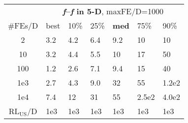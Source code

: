 \begin{tabular}{c|llllll}
 & \multicolumn{6}{|c}{\textbf{\textit{f}\raisebox{-0.35ex}{1}--\textit{f}\raisebox{-0.35ex}{24} in 5-D}, maxFE/D=1000}\\
\#FEs/D & best & 10\% & 25\% & \textbf{med} & 75\% & 90\%\\
2 & \hspace*{1ex}3.2 & \hspace*{1ex}4.2 & \hspace*{1ex}6.4 & \hspace*{1ex}9.2 & 10 & 10\\
10 & \hspace*{1ex}3.2 & \hspace*{1ex}4.4 & \hspace*{1ex}5.5 & 10 & 17 & 50\\
100 & \hspace*{1ex}1.2 & \hspace*{1ex}2.6 & \hspace*{1ex}7.1 & \hspace*{1ex}9.4 & 15 & 40\\
1e3 & \hspace*{1ex}2.7 & \hspace*{1ex}4.3 & \hspace*{1ex}9.0 & 32 & 55 & 1.2e2\\
1e4 & \hspace*{1ex}7.4 & 12 & 31 & 55 & 2.5e2 & 4.0e2\\
$\text{RL}_{\text{US}}$/D & 1e3 & 1e3 & 1e3 & 1e3 & 1e3 & 1e3
\end{tabular}

